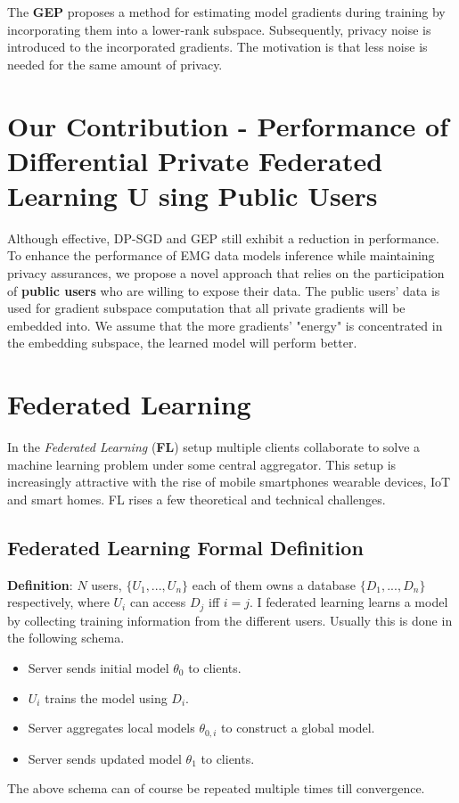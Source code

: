 \documentclass[fourier]{_style/dissertation}
\begin{document}
The \textbf{GEP} \cite{Yu2021DoLearning} proposes a method for estimating model gradients during training by incorporating them into a lower-rank subspace. Subsequently, privacy noise is introduced to the incorporated gradients. The motivation is that less noise is needed for the same amount of privacy. \\

\section{Our Contribution - Performance of Differential Private Federated Learning U sing Public Users }
Although effective, DP-SGD and GEP still exhibit a reduction in performance. To enhance the performance of EMG data models inference while maintaining privacy assurances, we propose a novel approach that relies on the participation of \textbf{public users} who are willing to expose their data. The public users' data is used for gradient subspace computation that all private gradients will be embedded into. We assume that the more gradients' "energy" is concentrated in the embedding subspace, the learned model will perform better.\\

\section{Federated Learning}
In the \textit{Federated Learning} (\textbf{FL}) setup multiple clients collaborate to solve a machine learning problem under some central aggregator. This setup is increasingly attractive with the rise of mobile smartphones wearable devices, IoT and smart homes. FL rises a few theoretical and technical challenges.

\subsection{Federated Learning Formal Definition}
\textbf{Definition}: $N$ users, $\{U_{1},...,U_{n}\}$ each of them owns a database  $\{D_{1},...,D_{n} \}$ respectively, where $U_{i}$ can access $D_{j}$ iff $i=j$. I federated learning learns a model by collecting training information from the different users. Usually this is done in the following schema.
\begin{itemize}
    \item Server sends initial model $\theta_{0}$ to clients.
    \item $U_{i}$ trains the model using $D_{i}$.
    \item Server aggregates local models $\theta_{0,i}$ to construct a global model.
    \item Server sends updated model $\theta_{1}$ to clients.
\end{itemize}
The above schema can of course be repeated multiple times till convergence.
\end{document}
